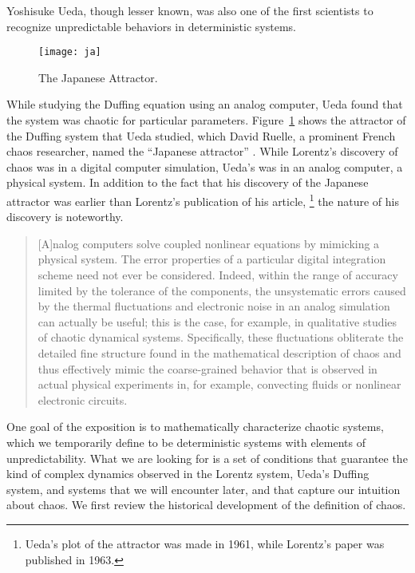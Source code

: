 \documentclass[10pt,twoside,draft]{book}
\begin{document}
Yoshisuke Ueda, though lesser known, was also one of the first scientists to recognize unpredictable behaviors in deterministic systems.
\begin{figure}[ht]
  \centering
  \texttt{[image: ja]}
  \caption{The Japanese Attractor.}
  \label{fig:ja}
\end{figure}
While studying the Duffing equation using an analog computer, Ueda found that the system was chaotic for particular parameters.
Figure~\ref{fig:ja} shows the attractor of the Duffing system that Ueda studied, which David Ruelle, a prominent French chaos researcher, named the ``Japanese attractor'' \citep{ruelle}.
While Lorentz's discovery of chaos was in a digital computer simulation, Ueda's was in an analog computer, a physical system.
In addition to the fact that his discovery of the Japanese attractor was earlier than Lorentz's publication of his article,
\footnote{Ueda's plot of the attractor was made in 1961, while Lorentz's paper was published in 1963.}
the nature of his discovery is noteworthy.
\begin{quotation}
  [A]nalog computers solve coupled nonlinear equations by mimicking a physical system.
  The error properties of a particular digital integration scheme need not ever be considered.
  Indeed, within the range of accuracy limited by the tolerance of the components, the unsystematic errors caused by the thermal fluctuations and electronic noise in an analog simulation can actually be useful; this is the case, for example, in qualitative studies of chaotic dynamical systems.
  Specifically, these fluctuations obliterate the detailed fine structure found in the mathematical description of chaos and thus effectively mimic the coarse-grained behavior that is observed in actual physical experiments in, for example, convecting fluids or nonlinear electronic circuits.
  \citep[p.383]{campbell}
\end{quotation}


One goal of the exposition is to mathematically characterize chaotic systems, which we temporarily define to be deterministic systems with elements of unpredictability.
What we are looking for is a set of conditions that guarantee the kind of complex dynamics observed in the Lorentz system, Ueda's Duffing system, and systems that we will encounter later, and that capture our intuition about chaos.
We first review the historical development of the definition of chaos.
\end{document}

